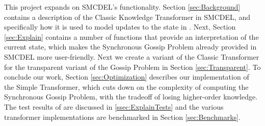 This project expands on SMCDEL's functionality. Section \ref{sec:Background} contains a description of
the Classic Knowledge Transformer in SMCDEL, and specifically how it is used to model updates to the state in \cite{GattingerThesis2018}.
Next, Section \ref{sec:Explain} contains a number of functions that provide an interpretation of the current state,
which makes the Synchronous Gossip Problem already provided in SMCDEL more user-friendly.
Next we create a variant of the Classic Transformer for the transparent variant of the Gossip Problem in Section \ref{sec:Transparent}.
To conclude our work, Section \ref{sec:Optimization} describes our implementation of the Simple Transformer,
which cuts down on the complexity of computing the Synchronous Gossip Problem, with the tradeoff of losing higher-order knowledge.
The test results of are discussed in \ref{ssec:ExplainTests} and the various transformer implementations are benchmarked in Section \ref{sec:Benchmarks}.
